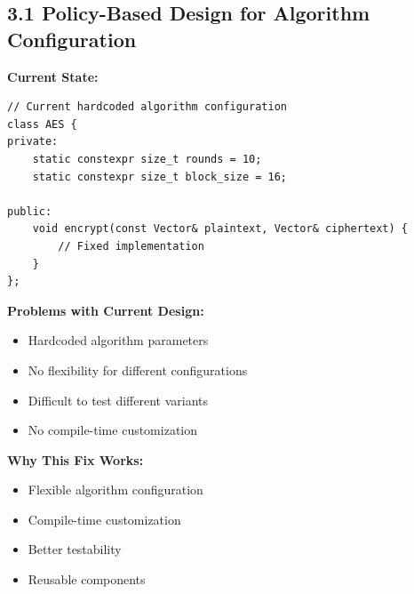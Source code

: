 \documentclass[11pt,a4paper]{article}
\begin{document}
\subsection{3.1 Policy-Based Design for Algorithm Configuration}

\textbf{Current State:}
\begin{lstlisting}
// Current hardcoded algorithm configuration
class AES {
private:
    static constexpr size_t rounds = 10;
    static constexpr size_t block_size = 16;
    
public:
    void encrypt(const Vector& plaintext, Vector& ciphertext) {
        // Fixed implementation
    }
};
\end{lstlisting}

\textcolor{problemred}{\textbf{Problems with Current Design:}}
\begin{itemize}
    \item Hardcoded algorithm parameters
    \item No flexibility for different configurations
    \item Difficult to test different variants
    \item No compile-time customization
\end{itemize}

\textcolor{solutiongreen}{\textbf{Why This Fix Works:}}
\begin{itemize}
    \item Flexible algorithm configuration
    \item Compile-time customization
    \item Better testability
    \item Reusable components
\end{itemize}
\end{document}

